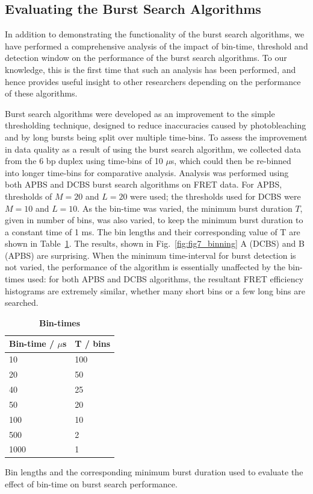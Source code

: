 \subsection{Evaluating the Burst Search Algorithms}
In addition to demonstrating the functionality of the burst search algorithms, we have performed a comprehensive analysis of the impact of bin-time, threshold and detection window on the performance of the burst search algorithms. To our knowledge, this is the first time that such an analysis has been performed, and hence provides useful insight to other researchers depending on the performance of these algorithms.

Burst search algorithms were developed as an improvement to the simple thresholding technique, designed to reduce inaccuracies caused by photobleaching and by long bursts being split over multiple time-bins. To assess the improvement in data quality as a result of using the burst search algorithm, we collected data from the 6 bp duplex using time-bins of 10 $\mu$s, which could then be re-binned into longer time-bins for comparative analysis. Analysis was performed using both APBS and DCBS burst search algorithms on FRET data. For APBS, thresholds of $M=20$ and $L=20$ were used; the thresholds used for DCBS were $M = 10$ and $L = 10$. As the bin-time was varied, the minimum burst duration $T$, given in number of bins, was also varied, to keep the minimum burst duration to a constant time of 1 ms. The bin lengths and their corresponding value of T are shown in Table~\ref{tab:bin-times}. The results, shown in Fig.~\ref{fig:fig7_binning} A (DCBS) and B (APBS) are surprising. When the minimum time-interval for burst detection is not varied, the performance of the algorithm is essentially unaffected by the bin-times used: for both APBS and DCBS algorithms, the resultant FRET efficiency histograms are extremely similar, whether many short bins or a few long bins are searched.


\begin{table}[!ht]
\caption{
\bf{Bin-times}}
\begin{tabular}{|l|l|}
\hline
Bin-time / $\mu$s & T / bins \\
\hline
10 & 100 \\
20 & 50 \\
40 & 25 \\
50 & 20 \\
100 & 10 \\
500 & 2 \\
1000 & 1\\
\hline
\end{tabular}
\begin{flushleft}
Bin lengths and the corresponding minimum burst duration used to evaluate the effect of bin-time on burst search performance.\end{flushleft}
\label{tab:bin-times}
\end{table}

